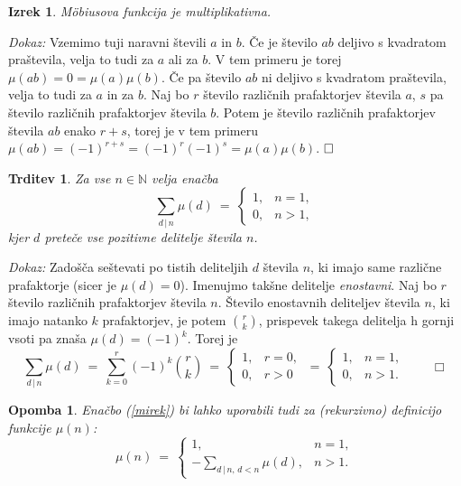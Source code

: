 \documentclass[a4paper,12pt]{article}
\def\N{\mathbb{N}} %
\def\qed{$\hfill\Box$}   %
\def\qedm{\qquad\Box}   %
\newtheorem{izrek}{Izrek}
\newtheorem{trditev}{Trditev}
\newtheorem{opomba}{Opomba}
\begin{document}
\begin{izrek}
\label{mimult}
M\"obiusova funkcija je multiplikativna.
\end{izrek}

\noindent
{\em Dokaz:\/} Vzemimo tuji naravni števili $a$ in $b$. Če je število $ab$ deljivo s kvadratom praštevila,
velja to tudi za $a$ ali za $b$. V tem primeru je torej $\mu(ab) = 0 = \mu(a)\mu(b)$.
Če pa število $ab$ ni deljivo s kvadratom praštevila, velja to tudi za $a$ in za $b$. Naj bo $r$ število različnih
prafaktorjev števila $a$, $s$ pa število različnih prafaktorjev števila $b$. Potem je število različnih 
prafaktorjev števila $ab$ enako $r+s$, torej je v tem primeru $\mu(ab) = (-1)^{r+s} = (-1)^r (-1)^s = \mu(a)\mu(b)$.
\qed


\begin{trditev}
Za vse $n \in \N$ velja enačba
\begin{equation}
\label{mirek}
\sum_{d\,|\,n} \mu(d)\ =\ \left\{
\begin{array}{ll}
1, & n = 1, \\
0, & n > 1,
\end{array}
\right.
\end{equation}
kjer $d$ preteče vse pozitivne delitelje števila $n$.
\end{trditev}

\noindent
{\em Dokaz:\/} 
Zadošča seštevati po tistih deliteljih $d$ števila $n$, ki imajo same različne prafaktorje (sicer je
$\mu(d) = 0$). Imenujmo takšne delitelje {\em enostavni}. Naj bo $r$ število različnih prafaktorjev
števila $n$. Število enostavnih deliteljev števila $n$, ki imajo natanko $k$ prafaktorjev, je potem ${r \choose k}$,
prispevek takega delitelja h gornji vsoti pa znaša $\mu(d) = (-1)^k$. Torej je
\[
\sum_{d\,|\,n} \mu(d)\ =\ 
\sum_{k=0}^r (-1)^k {r \choose k} \ =\ 
\left\{
\begin{array}{ll}
1, & r = 0, \\
0, & r > 0
\end{array}
\right.\ =\ \left\{
\begin{array}{ll}
1, & n = 1, \\
0, & n > 1.
\end{array}
\right. \qedm
\]

\begin{opomba}
Enačbo (\ref{mirek}) bi lahko uporabili tudi za (rekurzivno) definicijo funkcije $\mu(n)$:
\[
\mu(n)\ =\ \left\{
\begin{array}{cl}
1, & n = 1, \\
-\displaystyle\sum_{d\,|\,n, \,d < n} \mu(d), & n > 1.
\end{array}
\right.
\]
\end{opomba}
\end{document}
